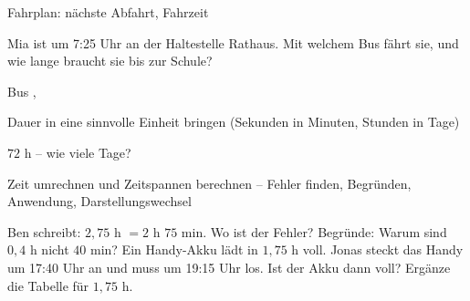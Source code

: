 \begin{aufgabe}{Fahrplan: nächste Abfahrt, Fahrzeit}
\begin{teile}
\teil Mia ist um 7:25 Uhr an der Haltestelle Rathaus. Mit welchem Bus fährt sie, und wie lange braucht sie bis zur Schule?

Bus \leerfeld , \leerfeld[min]
\end{teile}
\end{aufgabe}

\begin{aufgabe}{Dauer in eine sinnvolle Einheit bringen (Sekunden in Minuten, Stunden in Tage)}
\begin{teile}
\teil $72$ h – wie viele Tage? \leerfeld[Tage]
\end{teile}
\end{aufgabe}

\begin{aufgabe}{Zeit umrechnen und Zeitspannen berechnen – Fehler finden, Begründen, Anwendung, Darstellungswechsel}
\begin{teile}
\teil Ben schreibt: $2{,}75$ h $= 2$ h $75$ min. Wo ist der Fehler?
\teil Begründe: Warum sind $0{,}4$ h nicht $40$ min?
\teil Ein Handy-Akku lädt in $1{,}75$ h voll. Jonas steckt das Handy um 17:40 Uhr an und muss um 19:15 Uhr los. Ist der Akku dann voll?
\teil Ergänze die Tabelle für $1{,}75$ h.

\end{teile}
\end{aufgabe}
